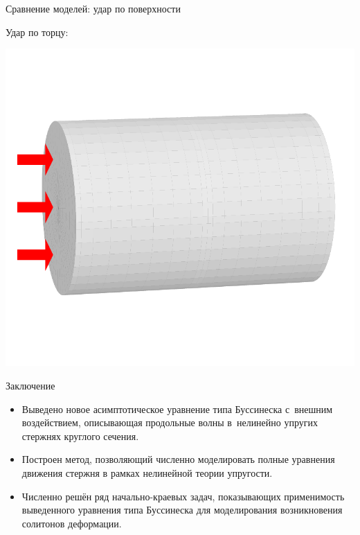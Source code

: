 \documentclass[usenames,dvipsnames]{beamer}
\begin{document}
\begin{frame}{Сравнение моделей: удар по поверхности}
\vspace{2mm}
\begin{minipage}{\textwidth}
	\begin{minipage}[b]{0.65\textwidth}
		\flushleft
		Удар по торцу:
	\end{minipage}
	\hfill
	\begin{minipage}[b]{0.34\textwidth}
		\includegraphics[width=\linewidth]{Figures/ImpactScheme}
	\end{minipage}
\end{minipage}
\end{frame}


\begin{frame}{Заключение}
\begin{itemize}
	\item Выведено 
	новое асимптотическое уравнение типа Буссинеска с~внешним воздействием, описывающая продольные волны в~нелинейно упругих стержнях круглого сечения.
	\item Построен метод, позволяющий численно моделировать полные уравнения движения стержня в рамках нелинейной теории упругости.
	\item Численно решён ряд начально-краевых задач, показывающих применимость выведенного уравнения типа Буссинеска для моделирования возникновения солитонов деформации.
\end{itemize}
\end{frame}
\end{document}

